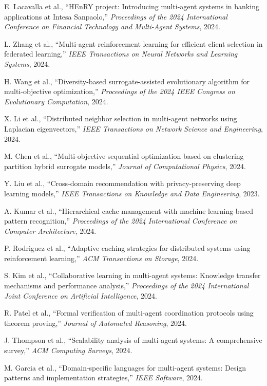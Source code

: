 \documentclass[conference]{IEEEtran}
\begin{document}
\begin{thebibliography}{00}
 E. Lacavalla et al., ``HEnRY project: Introducing multi-agent systems in banking applications at Intesa Sanpaolo,'' \emph{Proceedings of the 2024 International Conference on Financial Technology and Multi-Agent Systems}, 2024.

 L. Zhang et al., ``Multi-agent reinforcement learning for efficient client selection in federated learning,'' \emph{IEEE Transactions on Neural Networks and Learning Systems}, 2024.

 H. Wang et al., ``Diversity-based surrogate-assisted evolutionary algorithm for multi-objective optimization,'' \emph{Proceedings of the 2024 IEEE Congress on Evolutionary Computation}, 2024.

 X. Li et al., ``Distributed neighbor selection in multi-agent networks using Laplacian eigenvectors,'' \emph{IEEE Transactions on Network Science and Engineering}, 2024.

 M. Chen et al., ``Multi-objective sequential optimization based on clustering partition hybrid surrogate models,'' \emph{Journal of Computational Physics}, 2024.

 Y. Liu et al., ``Cross-domain recommendation with privacy-preserving deep learning models,'' \emph{IEEE Transactions on Knowledge and Data Engineering}, 2023.

 A. Kumar et al., ``Hierarchical cache management with machine learning-based pattern recognition,'' \emph{Proceedings of the 2024 International Conference on Computer Architecture}, 2024.

 P. Rodriguez et al., ``Adaptive caching strategies for distributed systems using reinforcement learning,'' \emph{ACM Transactions on Storage}, 2024.

 S. Kim et al., ``Collaborative learning in multi-agent systems: Knowledge transfer mechanisms and performance analysis,'' \emph{Proceedings of the 2024 International Joint Conference on Artificial Intelligence}, 2024.

 R. Patel et al., ``Formal verification of multi-agent coordination protocols using theorem proving,'' \emph{Journal of Automated Reasoning}, 2024.

 J. Thompson et al., ``Scalability analysis of multi-agent systems: A comprehensive survey,'' \emph{ACM Computing Surveys}, 2024.

 M. Garcia et al., ``Domain-specific languages for multi-agent systems: Design patterns and implementation strategies,'' \emph{IEEE Software}, 2024.


\end{thebibliography}
\end{document}
